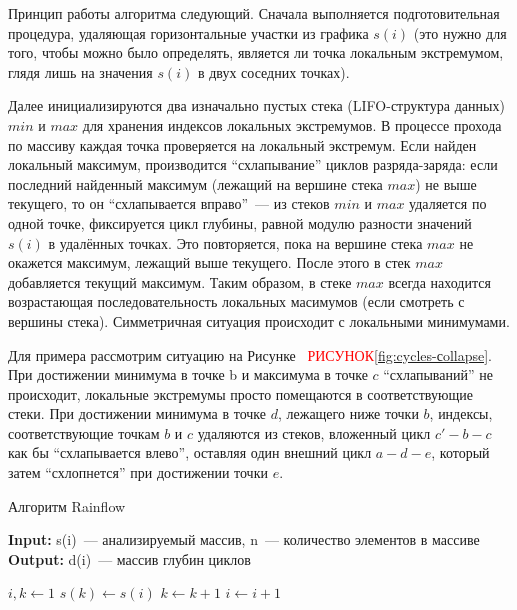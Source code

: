 \documentclass{report}
\begin{document}
\begin{enumerate}
Принцип работы алгоритма следующий. 
Сначала выполняется подготовительная процедура, удаляющая горизонтальные участки из графика $s(i)$ (это нужно для того, чтобы можно было определять, является ли точка локальным экстремумом, глядя лишь на значения $s(i)$ в двух соседних точках).

Далее инициализируются два изначально пустых стека (LIFO-структура данных) $min$ и $max$ для хранения индексов локальных экстремумов.
В процессе прохода по массиву каждая точка проверяется на локальный экстремум.
Если найден локальный максимум, производится ``схлапывание'' циклов разряда-заряда: если последний найденный максимум (лежащий на вершине стека $max$) не выше текущего, то он ``схлапывается вправо''~--- из стеков $min$ и $max$ удаляется по одной точке, фиксируется цикл глубины, равной модулю разности значений $s(i)$ в удалённых точках.
Это повторяется, пока на вершине стека $max$ не окажется максимум, лежащий выше текущего. 
После этого в стек $max$ добавляется текущий максимум.
Таким образом, в стеке $max$ всегда находится возрастающая последовательность локальных масимумов (если смотреть с вершины стека).
Симметричная ситуация происходит с локальными минимумами. 

Для примера рассмотрим ситуацию на Рисунке~ \textcolor{red}{РИСУНОК}\ref{fig:cycles-сollapse}.
При достижении минимума в точке b и максимума в точке $c$ ``схлапываний'' не происходит,
локальные экстремумы просто помещаются в  соответствующие стеки.
При достижении минимума в точке $d$, лежащего ниже точки $b$, 
индексы,  соответствующие точкам $b$ и $c$ удаляются из стеков,
вложенный цикл $c'-b-c$ как бы ``схлапывается влево'', 
оставляя один внешний цикл $a-d-e$, который затем ``схлопнется'' при достижении точки $e$. 

\begin{algorithm}
\caption{Алгоритм Rainflow}\label{alg:rainflow}
\hspace*{\algorithmicindent} \textbf{Input:} s(i)~--- анализируемый массив, n~--- количество элементов в массиве \\
\hspace*{\algorithmicindent} \textbf{Output:} d(i)~--- массив глубин циклов 
\begin{algorithmic}[1]

\State $i,k \gets 1$
 
    \State $s(k) \gets s(i)$ 
    \State $k \gets k + 1$
\EndIf
\State $i \gets i + 1$
\EndWhile
{}
\Statex


\end{algorithmic}
\end{algorithm}
\end{enumerate}
\end{document}
